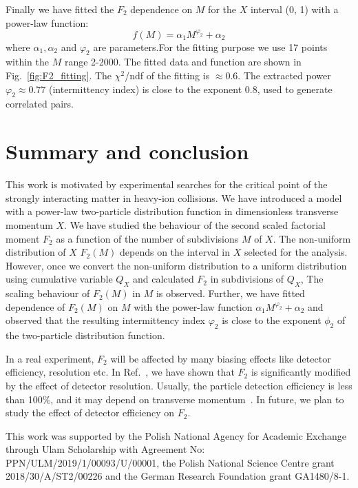 \documentclass[floatfix,superscriptaddress,a4paper,
               nofootinbib,preprint]{revtex4}
\begin{document}
Finally we have fitted the $F_2$  dependence on $M$ for the $X$ interval (0, 1) with a power-law function:
\begin{equation}\label{eq:fit_fn}
f(M) = \alpha_1 M^{\varphi_2} + \alpha_2
\end{equation}
where $\alpha_1, \alpha_2$ and $\varphi_2$ are parameters.For the fitting purpose we use 17 points within the $M$ range 2-2000. The fitted data and function
are shown in Fig.~\ref{fig:F2_fitting}. The $\chi^2$/ndf of the fitting is $\approx 0.6$.
The extracted power $\varphi_2 \approx 0.77$ (intermittency index) is close to the exponent $0.8$, used to generate correlated pairs. 


\section{Summary and conclusion}
\label{sec:summary}
This work is motivated by experimental searches for the critical point of the strongly interacting matter in heavy-ion collisions. We have introduced a model with a power-law two-particle distribution function in dimensionless transverse momentum $X$. We have studied the behaviour of the second scaled factorial moment $F_2$ as a function of the number of subdivisions $M$ of $X$. The non-uniform distribution of $X$ $F_2(M)$ depends on the interval in $X$ selected for the analysis. However, once we convert the non-uniform distribution to a uniform distribution using cumulative variable $Q_X$ and calculated $F_2$ in subdivisions of $Q_X$, 
The scaling behaviour of $F_2(M)$ in $M$ is observed. 
Further, we have fitted dependence of $F_2(M)$ on $M$ with the power-law function $\alpha_1 M ^{\varphi_2} + \alpha_2$ and observed that the resulting intermittency index $\varphi_2$ is close to the exponent $\phi_2$ of the two-particle distribution function.

In a real experiment, $F_2$ will be affected by many biasing effects like detector efficiency, resolution etc. In Ref.~\cite{Samanta:2021usk}, we have shown that  $F_2$ is significantly modified by the effect of detector resolution. Usually, the particle detection efficiency is less than 100\%, and it may depend on transverse momentum~\cite{NA61:2014lfx, STAR:2020tga}. In future, we plan to study the effect of detector efficiency on $F_2$. 


\begin{acknowledgments} 
This work was supported by 
the Polish National Agency for Academic Exchange through Ulam Scholarship with Agreement
No: PPN/ULM/2019/1/00093/U/00001,
the Polish National Science Centre grant 2018/30/A/ST2/00226 and the German Research Foundation grant GA1480\slash 8-1.

\end{acknowledgments}


% 

\end{document}
